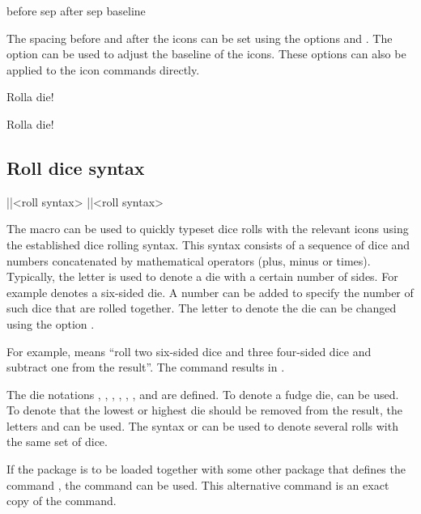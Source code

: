 \documentclass[a4paper]{article}
\begin{document}
\begin{macrodef}
before sep
after sep
baseline
\end{macrodef}
The spacing before and after the icons can be set using the options  and . The option  can be used to adjust the baseline of the icons. These options can also be applied to the icon commands directly.

\begin{codeexample}
Rolla die!

Rolla die!
\end{codeexample}

\subsection{Roll dice syntax}\label{sec:roll-dice-syntax}

\begin{macrodef}
|\roll|{<roll syntax>}
|\RPGIconsRoll|{<roll syntax>}
\end{macrodef}
The \macro{\roll} macro can be used to quickly typeset dice rolls with the relevant icons using the established dice rolling syntax. This syntax consists of a sequence of dice and numbers concatenated by mathematical operators (plus, minus or times). Typically, the letter  is used to denote a die with a certain number of sides. For example  denotes a six-sided die. A number can be added to specify the number of such dice that are rolled together. The letter to denote the die can be changed using the option . 

For example,  means ``roll two six-sided dice and three four-sided dice and subtract one from the result''. The command  results in .

The die notations , , , , , ,  and  are defined. To denote a fudge die,  can be used. To denote that the lowest or highest die should be removed from the result, the letters  and  can be used. The syntax  or  can be used to denote several rolls with the same set of dice.

If the  package is to be loaded together with some other package that defines the command \macro{\roll}, the command \macro{\RPGIconsRoll} can be used. This alternative command is an exact copy of the \macro{\roll} command. 
\end{document}
